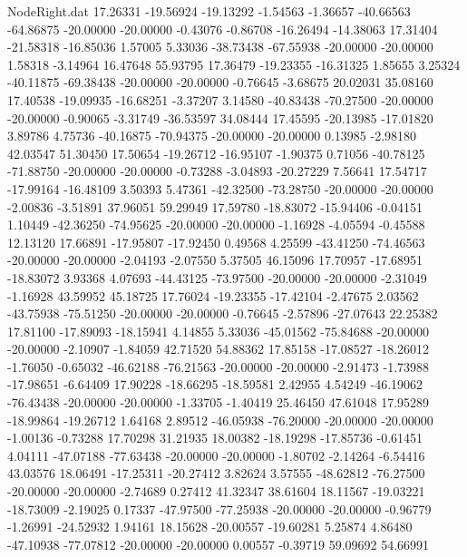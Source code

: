 \begin{filecontents}{NodeRight.dat}
  17.26331  -19.56924  -19.13292    -1.54563   -1.36657  -40.66563  -64.86875  -20.00000  -20.00000   -0.43076   -0.86708  -16.26494  -14.38063
  17.31404  -21.58318  -16.85036     1.57005    5.33036  -38.73438  -67.55938  -20.00000  -20.00000    1.58318   -3.14964   16.47648   55.93795
  17.36479  -19.23355  -16.31325     1.85655    3.25324  -40.11875  -69.38438  -20.00000  -20.00000   -0.76645   -3.68675   20.02031   35.08160
  17.40538  -19.09935  -16.68251    -3.37207    3.14580  -40.83438  -70.27500  -20.00000  -20.00000   -0.90065   -3.31749  -36.53597   34.08444
  17.45595  -20.13985  -17.01820     3.89786    4.75736  -40.16875  -70.94375  -20.00000  -20.00000    0.13985   -2.98180   42.03547   51.30450
  17.50654  -19.26712  -16.95107    -1.90375    0.71056  -40.78125  -71.88750  -20.00000  -20.00000   -0.73288   -3.04893  -20.27229    7.56641
  17.54717  -17.99164  -16.48109     3.50393    5.47361  -42.32500  -73.28750  -20.00000  -20.00000   -2.00836   -3.51891   37.96051   59.29949
  17.59780  -18.83072  -15.94406    -0.04151    1.10449  -42.36250  -74.95625  -20.00000  -20.00000   -1.16928   -4.05594   -0.45588   12.13120
  17.66891  -17.95807  -17.92450     0.49568    4.25599  -43.41250  -74.46563  -20.00000  -20.00000   -2.04193   -2.07550    5.37505   46.15096
  17.70957  -17.68951  -18.83072     3.93368    4.07693  -44.43125  -73.97500  -20.00000  -20.00000   -2.31049   -1.16928   43.59952   45.18725
  17.76024  -19.23355  -17.42104    -2.47675    2.03562  -43.75938  -75.51250  -20.00000  -20.00000   -0.76645   -2.57896  -27.07643   22.25382
  17.81100  -17.89093  -18.15941     4.14855    5.33036  -45.01562  -75.84688  -20.00000  -20.00000   -2.10907   -1.84059   42.71520   54.88362
  17.85158  -17.08527  -18.26012    -1.76050   -0.65032  -46.62188  -76.21563  -20.00000  -20.00000   -2.91473   -1.73988  -17.98651   -6.64409
  17.90228  -18.66295  -18.59581     2.42955    4.54249  -46.19062  -76.43438  -20.00000  -20.00000   -1.33705   -1.40419   25.46450   47.61048
  17.95289  -18.99864  -19.26712     1.64168    2.89512  -46.05938  -76.20000  -20.00000  -20.00000   -1.00136   -0.73288   17.70298   31.21935
  18.00382  -18.19298  -17.85736    -0.61451    4.04111  -47.07188  -77.63438  -20.00000  -20.00000   -1.80702   -2.14264   -6.54416   43.03576
  18.06491  -17.25311  -20.27412     3.82624    3.57555  -48.62812  -76.27500  -20.00000  -20.00000   -2.74689    0.27412   41.32347   38.61604
  18.11567  -19.03221  -18.73009    -2.19025    0.17337  -47.97500  -77.25938  -20.00000  -20.00000   -0.96779   -1.26991  -24.52932    1.94161
  18.15628  -20.00557  -19.60281     5.25874    4.86480  -47.10938  -77.07812  -20.00000  -20.00000    0.00557   -0.39719   59.09692   54.66991

\end{filecontents}
